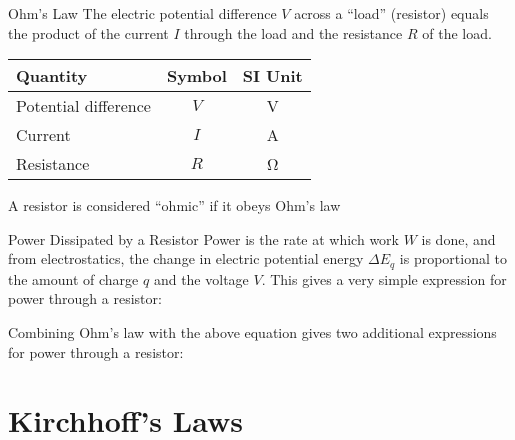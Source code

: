 \documentclass[12pt,aspectratio=169]{beamer}
\begin{document}
\begin{frame}{Ohm's Law}
  The electric potential difference $V$ across a ``load'' (resistor) equals the
  product of the current $I$ through the load and the resistance $R$ of the
  load.

  \begin{center}
    \begin{tabular}{l|c|c}
      \rowcolor{pink}
      \textbf{Quantity} & \textbf{Symbol} & \textbf{SI Unit} \\ \hline
      Potential difference & $V$    & \si\volt \\
      Current              & $I$    & \si\ampere \\
      Resistance           & $R$    & \si\ohm
    \end{tabular}
  \end{center}
  A resistor is considered ``ohmic'' if it obeys Ohm's law
\end{frame}


\begin{frame}{Power Dissipated by a Resistor}
  Power is the rate at which work $W$ is done, and from electrostatics, the
  change in electric potential energy $\Delta E_q$ is proportional to the
  amount of charge $q$ and the voltage $V$. This gives a very simple expression
  for power through a resistor:
  

  Combining Ohm's law with the above equation gives two additional expressions
  for power through a resistor:

\end{frame}


\section{Kirchhoff's Laws}
\end{document}
